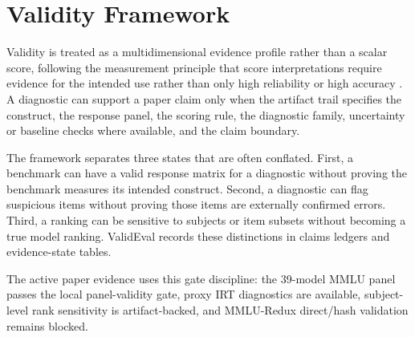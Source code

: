 \section{Validity Framework}

Validity is treated as a multidimensional evidence profile rather than a scalar score, following
the measurement principle that score interpretations require evidence for the intended use rather
than only high reliability or high accuracy \citep{messick1995validity,aera2014standards}. A
diagnostic can support a paper claim only when the artifact trail specifies the construct, the
response panel, the scoring rule, the diagnostic family, uncertainty or baseline checks where
available, and the claim boundary.

The framework separates three states that are often conflated. First, a benchmark can have a valid
response matrix for a diagnostic without proving the benchmark measures its intended construct.
Second, a diagnostic can flag suspicious items without proving those items are externally confirmed
errors. Third, a ranking can be sensitive to subjects or item subsets without becoming a true model
ranking. ValidEval records these distinctions in claims ledgers and evidence-state tables.

The active paper evidence uses this gate discipline: the 39-model MMLU panel passes the local
panel-validity gate, proxy IRT diagnostics are available, subject-level rank sensitivity is
artifact-backed, and MMLU-Redux direct/hash validation remains blocked.
